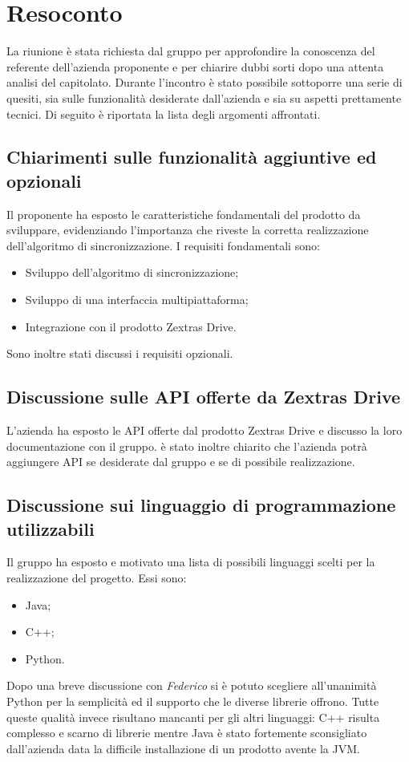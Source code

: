 \newpage


\section{Resoconto}
La riunione è stata richiesta dal gruppo \Gruppo{} per approfondire la conoscenza del referente dell'azienda proponente e per chiarire dubbi sorti dopo una attenta analisi del capitolato.
Durante l'incontro è stato possibile sottoporre una serie di quesiti, sia sulle funzionalità desiderate dall'azienda e sia su aspetti prettamente tecnici.
Di seguito è riportata la lista degli argomenti affrontati.
\subsection{Chiarimenti sulle funzionalità aggiuntive ed opzionali}
Il proponente ha esposto le caratteristiche fondamentali del prodotto da sviluppare, evidenziando l'importanza che riveste la corretta realizzazione dell'algoritmo di sincronizzazione.
I requisiti fondamentali sono:
\begin{itemize}
	\item Sviluppo dell'algoritmo di sincronizzazione;
	\item Sviluppo di una interfaccia multipiattaforma;
	\item Integrazione con il prodotto Zextras Drive.
\end{itemize}
Sono inoltre stati discussi i requisiti opzionali.
\subsection{Discussione sulle API offerte da Zextras Drive}
L'azienda ha esposto le API offerte dal prodotto Zextras Drive e discusso la loro documentazione con il gruppo. è stato inoltre chiarito che l'azienda potrà aggiungere API se  desiderate dal gruppo e se di possibile realizzazione.
\subsection{Discussione sui linguaggio di programmazione utilizzabili}
Il gruppo ha esposto e motivato una lista di possibili linguaggi scelti per la realizzazione del progetto. Essi sono:
\begin{itemize}
	\item Java;
	\item C++;
	\item Python.
\end{itemize}
Dopo una breve discussione con \textit{Federico} si è potuto scegliere all'unanimità Python per la semplicità ed il supporto che le diverse librerie offrono. Tutte queste qualità invece risultano mancanti per gli altri linguaggi: C++ risulta complesso e scarno di librerie mentre Java è stato fortemente sconsigliato dall'azienda data la difficile installazione di un prodotto avente la JVM.
\newpage

